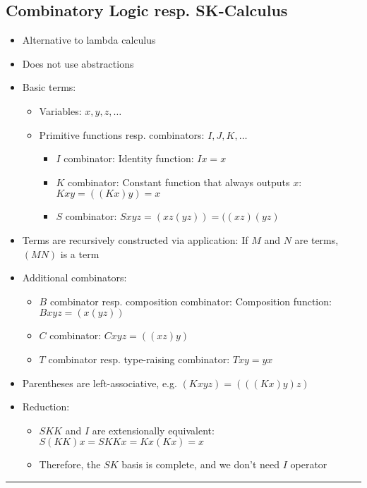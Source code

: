 \subsection*{Combinatory Logic resp. SK-Calculus}
\begin{itemize}
    \item Alternative to lambda calculus
    \item Does not use abstractions
    \item Basic terms:
    \begin{itemize}
        \item Variables: $x, y, z, \dots$
        \item Primitive functions resp. combinators: $I, J, K, \dots$
        \begin{itemize}
            \item $I$ combinator: Identity function: $Ix = x$
            \item $K$ combinator: Constant function that always outputs $x$: $Kxy = ((Kx)y) = x$
            \item $S$ combinator: $Sxyz = (xz(yz)) = ((xz)(yz)$
        \end{itemize}
    \end{itemize}
    \item Terms are recursively constructed via application: If $M$ and $N$ are terms, $(MN)$ is a term
    \item Additional combinators:
    \begin{itemize}
        \item $B$ combinator resp. composition combinator: Composition function: $Bxyz = (x(yz))$
        \item $C$ combinator: $Cxyz = ((xz)y)$
        \item $T$ combinator resp. type-raising combinator: $Txy = yx$
    \end{itemize}
    \item Parentheses are left-associative, e.g. $(Kxyz) = (((Kx)y)z)$
    \item Reduction: 
    \begin{itemize}
        \item $SKK$ and $I$ are extensionally equivalent: $S(KK)x = SKKx = K x(K x) = x$
        \item Therefore, the $SK$ basis is complete, and we don't need $I$ operator
    \end{itemize}
\end{itemize}

{\color{black}\hrule height 0.001mm}

